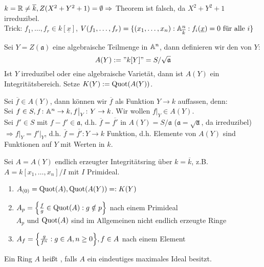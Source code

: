 	$k = \RR \neq \overline{k}, Z(X^2+Y^2+1) = \emptyset \Rightarrow$ Theorem ist falsch, da $X^2+Y^2+1$ irreduzibel.  \\
	Trick: $f_1,\dots,f_r \in k[\underline{x}]$, $V(f_1,\dots,f_r) = \{ (x_1,\dots,x_n) : \aff_{\overline{k}}^n : f_i(\underline{x}) = 0 \text{ für alle } i\}$
	
Sei $Y = Z(\mathfrak{a})$ eine algebraische Teilmenge in $\aff^n$, dann definieren wir den  von $Y$:
\[ A(Y) := "k[Y]" = S/\sqrt{\mathfrak{a}} \]
Ist $Y$ irreduzibel oder eine algebraische Varietät, dann ist $A(Y)$ ein Integritätsbereich. Setze $K(Y) := \Quot(A(Y))$.

Sei $\overline{f} \in A(Y)$, dann können wir $\overline{f}$ als Funktion $Y \rightarrow k$ auffassen, denn: \\
Sei $f \in S, f\colon \aff^n \rightarrow k, f \big|_Y \colon Y \rightarrow k$. Wir wollen $f \big|_Y \in A(Y)$. \\
Sei $f' \in S$ mit $f - f' \in \mathfrak{a}$, d.h. $\overline{f} = \overline{f'}$ in $A(Y) = S/\mathfrak{a}$ ($\mathfrak{a} = \sqrt{\mathfrak{a}}$, da irreduzibel) \\
$\Rightarrow f \big|_Y = f'\big|_Y$, d.h. $\overline{f} = \overline{f'} \colon Y \rightarrow k$ Funktion, d.h. Elemente von $A(Y)$ sind Funktionen auf $Y$ mit Werten in $k$.

\begin{defn}[Lokalisierung]
	Sei $A = A(Y)$ endlich erzeugter Integritätsring über $k = \overline{k}$, z.B. $A = k[x_1,\dots,x_n]/I$ mit $I$ Primideal. \begin{enumerate}[1)]
		\item $A_{(0)} = \Quot(A), \Quot(A(Y)) =: K(Y)$
		\item $A_p = \penbrace*{\frac{f}{g} \in \Quot(A) : g \notin p}$ \qquad {} nach einem Primideal \\
		$A_p$ und $\Quot(A)$ sind im Allgemeinen nicht endlich erzeugte Ringe
		\item $A_f = \penbrace*{ \frac{g}{f^n} : g \in A, n \geq 0}, f \in A$ \qquad {} nach einem Element 
	\end{enumerate}
\end{defn}

\begin{defn}
	Ein Ring $A$ heißt , falls $A$ ein eindeutiges maximales Ideal besitzt. 
\end{defn}


